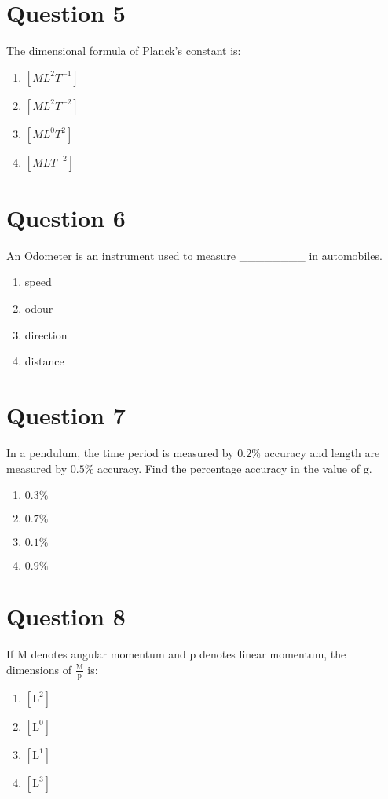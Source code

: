 \documentclass{article}
\begin{document}
\section*{Question 5}
The dimensional formula of Planck's constant is:
\begin{enumerate}[label=(\alph*)]
\item \(\left[M L^{2} T^{-1}\right]\)
\item \(\left[M L^{2} T^{-2}\right]\)
\item \(\left[M L^{0} T^{2}\right]\)
\item \(\left[M L T^{-2}\right]\)
\end{enumerate}
\newpage
\section*{Question 6}
An Odometer is an instrument used to measure ________ in automobiles.
\begin{enumerate}[label=(\alph*)]
\item speed
\item odour
\item direction
\item distance
\end{enumerate}
\newpage
\section*{Question 7}
In a pendulum, the time period is measured by \(0.2 \%\) accuracy and length are measured by \(0.5 \%\) accuracy. Find the percentage accuracy in the value of \(\mathrm{g}\).
\begin{enumerate}[label=(\alph*)]
\item \(0.3 \%\)
\item \(0.7 \%\)
\item \(0.1 \%\)
\item \(0.9 \%\)
\end{enumerate}
\newpage
\section*{Question 8}
If \(\mathrm{M}\) denotes angular momentum and \(\mathrm{p}\) denotes linear momentum, the dimensions of \(\frac{\mathrm M}{\mathrm p}\) is:
\begin{enumerate}[label=(\alph*)]
\item \([\mathrm L^2]\)
\item \([\mathrm L^0]\)
\item \([\mathrm L^1]\)
\item \([\mathrm L^3]\)
\end{enumerate}
\newpage
\end{document}
